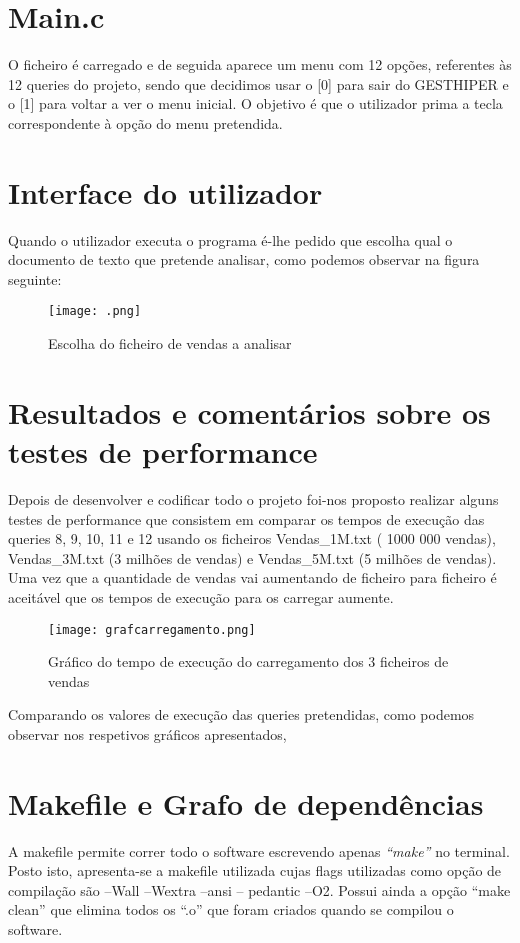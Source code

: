 \chapter{Main.c}
O ficheiro é carregado e de seguida aparece um menu com 12 opções, referentes às 12 queries do projeto, sendo que decidimos usar o [0] para sair do GESTHIPER e o [1] para voltar a ver o menu inicial. O objetivo é que o utilizador prima a tecla correspondente à opção do menu pretendida.



\chapter{Interface do utilizador}
Quando o utilizador executa o programa é-lhe pedido que escolha qual o documento de texto que pretende analisar, como podemos observar na figura seguinte: 

\begin{figure}[h!]
	\texttt{[image: .png]}  
	\caption{Escolha do ficheiro de vendas a analisar}  
\end{figure}



\chapter{Resultados e comentários sobre os testes de performance}
Depois de desenvolver e codificar todo o projeto foi-nos proposto realizar alguns testes de performance que consistem em comparar os tempos de execução das queries 8, 9, 10, 11 e 12 usando os ficheiros Vendas\_1M.txt ( 1000 000 vendas), Vendas\_3M.txt (3 milhões de vendas) e Vendas\_5M.txt (5 milhões de vendas).
Uma vez que a quantidade de vendas vai aumentando de ficheiro para ficheiro é aceitável que os tempos de execução para os carregar aumente.


\begin{figure}[h!]
	\centering
	\texttt{[image: grafcarregamento.png]}  
	\caption{Gráfico do tempo de execução do carregamento dos 3 ficheiros de vendas}  
\end{figure}

Comparando os valores de execução das queries pretendidas, como podemos observar nos respetivos gráficos apresentados,




\chapter{Makefile e Grafo de dependências}
A makefile permite correr todo o software escrevendo apenas \textit{“make”} no terminal. Posto isto, apresenta-se a makefile utilizada cujas flags utilizadas como opção de compilação são –Wall –Wextra –ansi – pedantic –O2.
Possui ainda a opção “make clean” que elimina todos os “.o” que foram criados quando se compilou o software.

